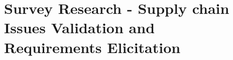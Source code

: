 \chapter{Survey Research - Supply chain Issues Validation and Requirements Elicitation}
\label{chap:survey}
\minitoc \mtcskip \noindent
{}






